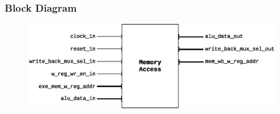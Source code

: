 \documentclass{article}
\begin{document}
  \subsubsection{Block Diagram}
  \begin{figure}[H]
    \centering
    \includegraphics[width=\linewidth]{pictures/blocks/mem_block.eps}
  \end{figure} 
\end{document}
